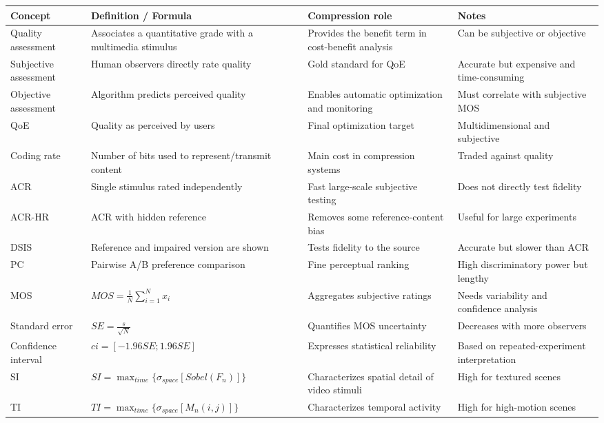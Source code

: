 \begin{center}
\begin{tabular}{|l|l|l|l|}
\hline
\textbf{Concept} & \textbf{Definition / Formula} & \textbf{Compression role} & \textbf{Notes} \\ \hline
Quality assessment & Associates a quantitative grade with a multimedia stimulus & Provides the benefit term in cost-benefit analysis & Can be subjective or objective \\ \hline
Subjective assessment & Human observers directly rate quality & Gold standard for QoE & Accurate but expensive and time-consuming \\ \hline
Objective assessment & Algorithm predicts perceived quality & Enables automatic optimization and monitoring & Must correlate with subjective MOS \\ \hline
QoE & Quality as perceived by users & Final optimization target & Multidimensional and subjective \\ \hline
Coding rate & Number of bits used to represent/transmit content & Main cost in compression systems & Traded against quality \\ \hline
ACR & Single stimulus rated independently & Fast large-scale subjective testing & Does not directly test fidelity \\ \hline
ACR-HR & ACR with hidden reference & Removes some reference-content bias & Useful for large experiments \\ \hline
DSIS & Reference and impaired version are shown & Tests fidelity to the source & Accurate but slower than ACR \\ \hline
PC & Pairwise A/B preference comparison & Fine perceptual ranking & High discriminatory power but lengthy \\ \hline
MOS & $MOS = \frac{1}{N}\sum_{i=1}^{N}x_i$ & Aggregates subjective ratings & Needs variability and confidence analysis \\ \hline
Standard error & $SE = \frac{s}{\sqrt{N}}$ & Quantifies MOS uncertainty & Decreases with more observers \\ \hline
Confidence interval & $ci = [-1.96SE; 1.96SE]$ & Expresses statistical reliability & Based on repeated-experiment interpretation \\ \hline
SI & $SI = \max_{time}\{\sigma_{space}[Sobel(F_n)]\}$ & Characterizes spatial detail of video stimuli & High for textured scenes \\ \hline
TI & $TI = \max_{time}\{\sigma_{space}[M_n(i,j)]\}$ & Characterizes temporal activity & High for high-motion scenes \\ \hline

\end{tabular}
\end{center}
